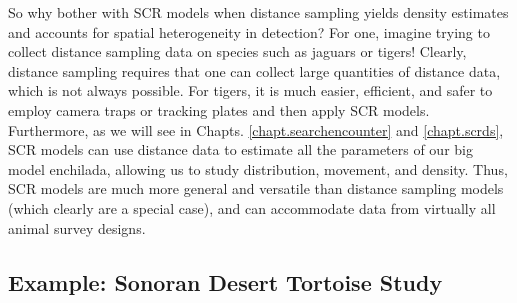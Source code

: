 So why bother with SCR models when distance sampling yields density
estimates and accounts for spatial heterogeneity in detection? For
one, imagine trying to collect distance sampling data on species such
as jaguars or tigers!  Clearly, distance sampling requires that one
can collect large quantities of distance data, which is not always
possible. For tigers, it is much easier, efficient, and safer to
employ camera traps or tracking plates and then apply SCR
models. Furthermore, as we will see in Chapts.
\ref{chapt.searchencounter} and \ref{chapt.scrds}, SCR models can use
distance data to estimate all the parameters of our big model
enchilada, allowing us to study distribution, movement, and
density. Thus, SCR models are much more general and versatile than
distance sampling models (which clearly are a special case), and can
accommodate data from virtually all animal survey designs.

\subsection{Example: Sonoran Desert Tortoise Study}

